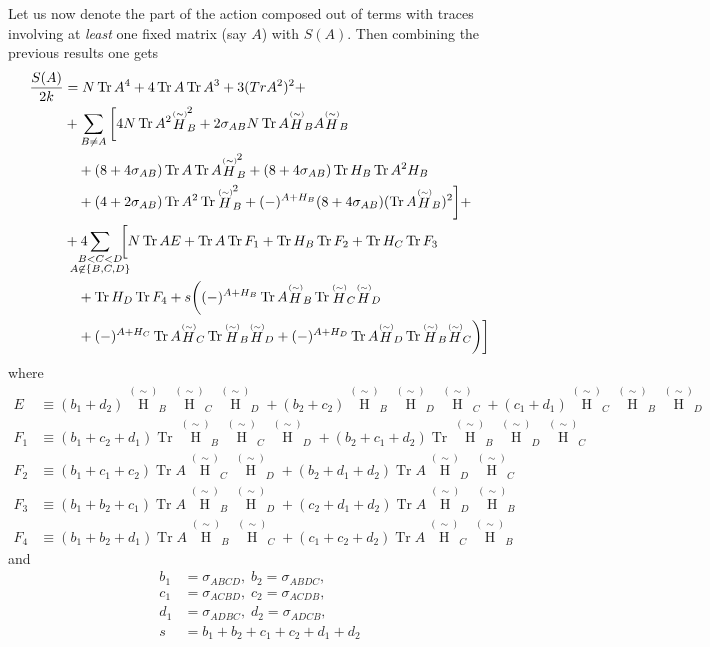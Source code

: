 \documentclass[10pt,a4paper]{article}
\newcommand\ptwid[1]{\mathord{\mathop{#1}\limits^{\scriptscriptstyle(\sim)}}}
\DeclareMathOperator{\Tr}{Tr}
\begin{document}
Let us now denote the part of the action composed out of terms with traces
involving at \textit{least} one fixed matrix (say $A$) with $S(A)$.
Then combining the previous results one gets
\begin{align}
  \frac{S(A)}{2k} &= N \Tr A^4 + 4 \Tr A \Tr A^3 + 3 (Tr A^2)^2 + \\
  &+ \sum_{B \neq A} \bigg[ 4N\Tr A^2 \ptwid H_B^2
    + 2 \sigma_{AB}N \Tr A \ptwid H_B A \ptwid H_B \\
    &\quad+ (8+4\sigma_{AB}) \Tr A \Tr A \ptwid H_B^2
    + (8+4\sigma_{AB}) \Tr H_B \Tr A^2 H_B \\
    &\quad+ (4+2\sigma_{AB}) \Tr A^2 \Tr \ptwid H_B^2
  + (-)^{A+H_B} (8+4\sigma_{AB}) (\Tr A \ptwid H_B)^2 \bigg] + \\
  &+ 4 \sum_{\mathclap{\substack{B < C < D\\A \not \in \{B,C,D\} }}}
  \;\;
  \bigg[
    N \Tr A E +
    \Tr A \Tr F_1 +
    \Tr H_B \Tr F_2 +
    \Tr H_C \Tr F_3 \\
    &\quad+
    \Tr H_D \Tr F_4 +
    s \bigg(
      (-)^{A+H_B} \Tr A \ptwid H_B \Tr \ptwid H_C \ptwid H_D \\
      &\quad+     (-)^{A+H_C} \Tr A \ptwid H_C \Tr \ptwid H_B \ptwid H_D +
      (-)^{A+H_D} \Tr A \ptwid H_D \Tr \ptwid H_B \ptwid H_C
    \bigg)
  \bigg]
\end{align}
where
\begin{align}
  E &\equiv
  (b_1 + d_2) \ptwid H_B \ptwid H_C \ptwid H_D +
  (b_2 + c_2) \ptwid H_B \ptwid H_D \ptwid H_C +
  (c_1 + d_1) \ptwid H_C \ptwid H_B \ptwid H_D \\
  F_1 &\equiv
    (b_1+c_2+d_1) \Tr \ptwid H_B \ptwid H_C \ptwid H_D +
    (b_2+c_1+d_2) \Tr \ptwid H_B \ptwid H_D \ptwid H_C \\
  F_2 &\equiv
    (b_1+c_1+c_2) \Tr A \ptwid H_C \ptwid H_D +
    (b_2+d_1+d_2) \Tr A \ptwid H_D \ptwid H_C \\
  F_3 &\equiv
    (b_1+b_2+c_1) \Tr A \ptwid H_B \ptwid H_D +
    (c_2+d_1+d_2) \Tr A \ptwid H_D \ptwid H_B \\
  F_4 &\equiv
    (b_1+b_2+d_1) \Tr A \ptwid H_B \ptwid H_C +
    (c_1+c_2+d_2) \Tr A \ptwid H_C \ptwid H_B
\end{align}
and
\begin{align}
  b_1 &= \sigma_{ABCD},\; b_2 = \sigma_{ABDC}, \\
  c_1 &= \sigma_{ACBD},\; c_2 = \sigma_{ACDB}, \\
  d_1 &= \sigma_{ADBC},\; d_2 = \sigma_{ADCB}, \\
  s &= b_1 + b_2 + c_1 + c_2 + d_1 + d_2
\end{align}
\end{document}
